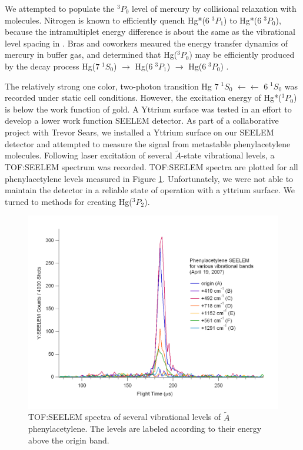 \documentclass[12pt]{mitthesis}
\begin{document}
We attempted to populate the $^3P_0$ level of mercury by collisional
relaxation with  molecules.  Nitrogen is known to efficiently
quench Hg*($6 \; ^3P_1$) to Hg*($6 \; ^3P_0$), because the
intramultiplet energy difference is about the same as the vibrational
level spacing in  \cite{callear70, horiguchi71}.  Bras and
coworkers meaured the energy transfer dynamics of mercury in 
buffer gas, and determined that Hg($^3P_0$) may be efficiently
produced by the decay process Hg($7 \; ^1S_0$) $\rightarrow$ Hg($6 \;
^3P_1$) $\rightarrow$ Hg($6 \; ^3P_0$) \cite{bras93}.

The relatively strong one color, two-photon transition Hg $7 \; ^1S_0$
$\leftarrow\leftarrow$ $6 \; ^1S_0$ was recorded under static cell
conditions.  However, the excitation energy of Hg*($^3P_0$) is below
the work function of gold.  A Yttrium surface was tested in an effort
to develop a lower work function SEELEM detector.  As part of a
collaborative project with Trevor Sears, we installed a Yttrium
surface on our SEELEM detector and attempted to measure the signal
from metastable phenylacetylene molecules.  Following laser excitation
of several $\tilde{A}$-state vibrational levels, a TOF:SEELEM spectrum
was recorded.  TOF:SEELEM spectra are plotted for all phenylacetylene
levels measured in Figure \ref{fig:phenylacetylene-tofs}.
Unfortunately, we were not able to maintain the detector in a reliable
state of operation with a yttrium surface.  We turned to methods for
creating Hg($^3P_2$).

\begin{figure}
  \caption{TOF:SEELEM spectra of several vibrational levels of
    $\tilde{A}$ phenylacetylene.  The levels are labeled according to
    their energy above the origin band.
    }
  \label{fig:phenylacetylene-tofs}
  \centering
  \includegraphics[width=8in,angle=90]{phenylacetylene-tofs.pdf}
\end{figure}
\end{document}
